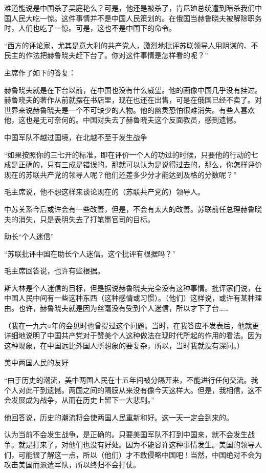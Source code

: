 难道能说是中国杀了吴庭艳么？可是，他还是被杀了，肯尼廸总统遭到暗杀我们中国人民大吃一惊。这件事情并不是中国人民策划的。在俄国当赫鲁晓夫被解除职务时，人们也吃了一惊。可是，这也不是中国下的命令。

“西方的评论家，尤其是意大利的共产党人，激烈地批评苏联领导人用阴谋的、不民主的作法把赫鲁晓夫赶下台了。你对这件事情是怎样看的呢？”

主席作了如下的答复：

赫鲁晓夫就是在下台以前，在中国也没有什么威望。他的画像中国几乎没有挂过。赫鲁晓夫的著作从前就摆在书店里，现在也还在出售，可是在俄国已经不卖了。对世界来说赫鲁晓夫是一个不可缺少的人物。他的幽灵恐怕很难消失。有些人喜欢他，这也是无可奈何的。中国对失去了赫鲁晓夫这个反面教员，感到遗憾。

中国军队不越过国境，在北越不至于发生战争

“如果按照你的三七开的标准，即在评价一个人的功过的时候，只要他的行动的七成是正确的，只有三成是错误的，那就可以认为是说得过去的，那么，你怎样评价现在的苏联共产党的领导人呢？他们还差多少分才能达到及格的分数呢？”

毛主席说，他不想这样来谈论现在的（苏联共产党的）领导人。

中苏关系今后或许会有一些改善，但是，不会有太大的改善。苏联前任总理赫鲁晓夫的消失，只是表明失去了打笔墨官司的目标。

助长“个人迷信”

“苏联批评中国在助长个人迷信。这个批评有根据吗？”

毛主席回答说，也许有些根据。

斯大林是个人迷信的目标，但是据说赫鲁晓夫完全没有这种事情。批评家们说，在中国人民中间有一些这种东西（这种感情或习惯）。（他们）这样说，或许有某种理由。也许，赫鲁晓夫就是因为丝毫没有受到个人迷信，所以才下了台……

（我在一九六○年的会见时也曾提过这个问题。当时，在我答应不发表后，他就更详细地说明了中国共产党对于赞美个人这种做法在现时代所起的作用的看法。因为这种现象，在中国远比外国人所想象的要复杂，所以，当时我就没有深问。）

美中两国人民的友好

“由于历史的潮流，美中两国人民在十五年间被分隔开来，不能进行任何交流。我个人对此干到遗憾。两国之间的隔膜从来没有像今天这样大。但是，我相信，这不会发展成为战争，从而在历史上留下一大悲剧。”

他回答说，历史的潮流将会使两国人民重新和好。这一天一定会到来的。

认为当前不会发生战争，是正确的。只要美国军队不打到中国来，就不会发生战争。就是打来了，对他们也没有好处。因为不能容许这种事情发生。美国的领导人们，可能很了解这一点，所以（他们）才不敢侵略中国吧！当然，中国绝对不会为攻击美国而派遣军队，所以终归不会打仗。

